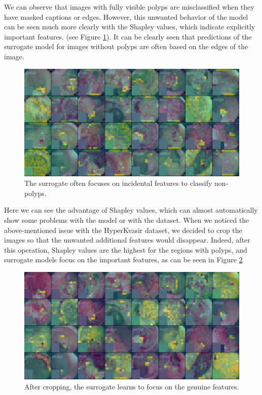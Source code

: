 \documentclass[en]{pracamgr}
\begin{document}
We can observe that images with fully visible polyps are misclassified when they have masked captions or edges.
However, this unwanted behavior of the model can be seen much more clearly with the Shapley values, which indicate explicitly important features.
(see Figure \ref{Shapley values gastro}). It can be clearly seen that predictions of the surrogate model for images without polyps are often based on the edges of the image.

\begin{figure}[H]
\centering
\includegraphics[scale=0.5]{./images/shap_gastro_edges.png}
\caption{The surrogate often focuses on incidental features to classify non-polyps.}
\label{Shapley values gastro}
\end{figure}




Here we can see the advantage of Shapley values, which can almost automatically show some problems with the model or with the dataset.
When we noticed the above-mentioned issue with the HyperKvasir dataset, we decided to crop the images so that the unwanted additional features would disappear. Indeed, after this operation, Shapley values are the highest for the regions with polyps, and surrogate models focus on the important features, as can be seen in Figure
\ref{Shapley values for 196 players cropped gastro}

\begin{figure}[H]
\centering
\includegraphics[scale=0.5]{./images/cropped_shap_gastro.png}
\caption{After cropping, the surrogate learns to focus on the genuine features.}
\label{Shapley values for 196 players cropped gastro}
\end{figure}
\end{document}
